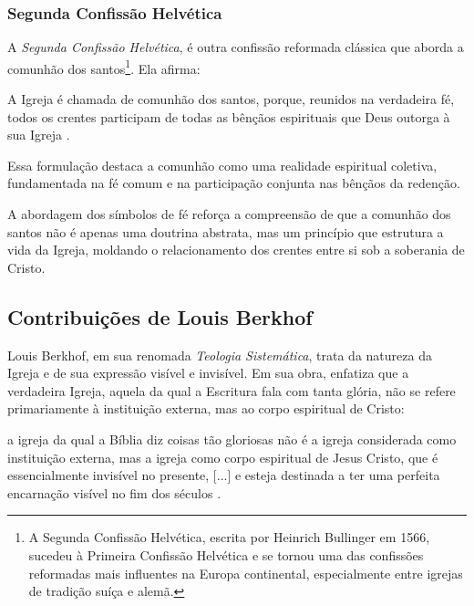 \subsubsection{Segunda Confissão Helvética}
A \textit{Segunda Confissão Helvética}, é outra confissão reformada clássica que aborda a comunhão dos santos\footnote{A Segunda Confissão Helvética, escrita por Heinrich Bullinger em 1566, sucedeu à Primeira Confissão Helvética e se tornou uma das confissões reformadas mais influentes na Europa continental, especialmente entre igrejas de tradição suíça e alemã.}. Ela afirma:
\begin{citacao}
A Igreja é chamada de comunhão dos santos, porque, reunidos na verdadeira fé, todos os crentes participam de todas as bênçãos espirituais que Deus outorga à sua Igreja \cite{helvetica}.
\end{citacao}

Essa formulação destaca a comunhão como uma realidade espiritual coletiva, fundamentada na fé comum e na participação conjunta nas bênçãos da redenção.

A abordagem dos símbolos de fé reforça a compreensão de que a comunhão dos santos não é apenas uma doutrina abstrata, mas um princípio que estrutura a vida da Igreja, moldando o relacionamento dos crentes entre si sob a soberania de Cristo.

\subsection{Contribuições de Louis Berkhof}

Louis Berkhof, em sua renomada \textit{Teologia Sistemática}, trata da natureza da Igreja e de sua expressão visível e invisível. Em sua obra, enfatiza que a verdadeira Igreja, aquela da qual a Escritura fala com tanta glória, não se refere primariamente à instituição externa, mas ao corpo espiritual de Cristo:

\begin{citacao}
a igreja da qual a Bíblia diz coisas tão gloriosas não é a igreja considerada como instituição externa, mas a igreja como corpo espiritual de Jesus Cristo, que é essencialmente invisível no presente, [...] e esteja destinada a ter uma perfeita encarnação visível no fim dos séculos \cite[p.~644]{berkhof2012}.
\end{citacao}

